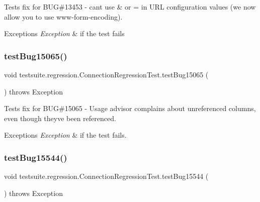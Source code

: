 Tests fix for B\+UG\#13453 -\/ can\textquotesingle{}t use \& or = in U\+RL configuration values (we now allow you to use www-\/form-\/encoding).


\begin{DoxyExceptions}{Exceptions}
{\em Exception} & if the test fails \\
\hline
\end{DoxyExceptions}
\mbox{\label{classtestsuite_1_1regression_1_1_connection_regression_test_a35b61648054c98948b1f82e6b078c9b7}} 
\subsubsection{\texorpdfstring{test\+Bug15065()}{testBug15065()}}
{\footnotesize\ttfamily void testsuite.\+regression.\+Connection\+Regression\+Test.\+test\+Bug15065 (\begin{DoxyParamCaption}{ }\end{DoxyParamCaption}) throws Exception}

Tests fix for B\+UG\#15065 -\/ Usage advisor complains about unreferenced columns, even though they\textquotesingle{}ve been referenced.


\begin{DoxyExceptions}{Exceptions}
{\em Exception} & if the test fails. \\
\hline
\end{DoxyExceptions}
\mbox{\label{classtestsuite_1_1regression_1_1_connection_regression_test_aeed00da9768a6a691550e641b5b02b8c}} 
\subsubsection{\texorpdfstring{test\+Bug15544()}{testBug15544()}}
{\footnotesize\ttfamily void testsuite.\+regression.\+Connection\+Regression\+Test.\+test\+Bug15544 (\begin{DoxyParamCaption}{ }\end{DoxyParamCaption}) throws Exception}

